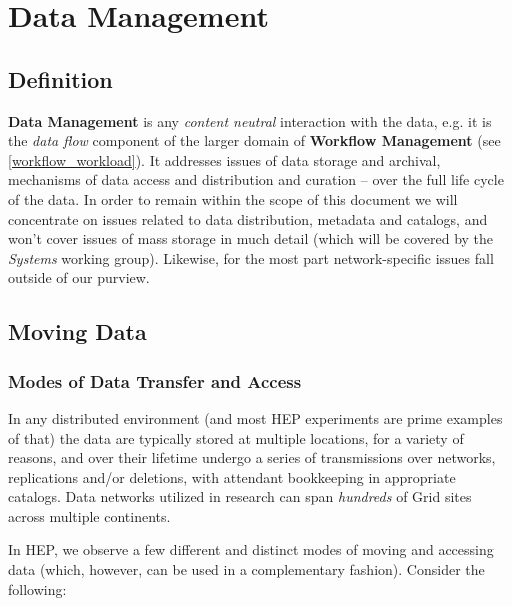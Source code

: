 \section{Data Management}
\label{data}


\subsection{Definition}
\textbf{Data Management} is any \textit{content neutral} interaction with the data, e.g. it is the \textit{data flow}
component of the larger domain of  \textbf{Workflow Management} (see \ref{workflow_workload}). It addresses issues of data storage
and archival, mechanisms of data access and distribution and  curation -- over the full life cycle of the data. In order to remain within
the scope of this document we will
concentrate on issues related to data distribution, metadata and catalogs, and won't cover issues of mass storage
in much detail (which will be covered by the \textit{Systems} working group). Likewise, for the most part network-specific issues fall outside of our purview.



\subsection{Moving Data}
\subsubsection{Modes of Data Transfer and Access}
\label{data_xfer}
In any distributed environment (and most HEP experiments are prime examples of that) the data are typically stored at multiple locations,
for a variety of reasons, and over their lifetime undergo a series of transmissions over networks, replications and/or deletions, with attendant bookkeeping
in appropriate catalogs. Data networks utilized in research can span \textit{hundreds} of Grid sites across multiple continents.

In HEP, we observe a few different and distinct modes of moving and accessing data (which, however, can be used in a complementary fashion).
Consider the following:

